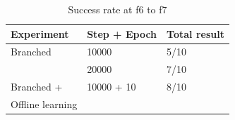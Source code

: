 \begin{table}[]
  \centering
  \caption{Success rate at f6 to f7}
  \begin{tabular}{lll}
  \hline
  Experiment         & Step + Epoch & Total result \\ \hline
  Branched           & 10000        & 5/10         \\ 
                     & 20000        & 7/10         \\ \hline
  Branched +         & 10000 + 10   & 8/10         \\ 
  Offline learning   &              &              \\ \hline
  \end{tabular}
  \label{tab:f_result}
\end{table}